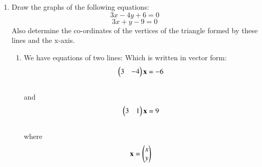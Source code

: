 \documentclass[journal,12pt,twocolumn]{IEEEtran}
\renewcommand\thesection{\arabic{section}}
\begin{document}
\begin{enumerate}[label=\thesection.\arabic*.,ref=\thesection.\theenumi]
\item Draw the graphs of the following equations: 
\[ 3x-4y+6=0 \]
\[ 3x+y-9=0 \]
Also determine the co-ordinates of the vertices of the triangle formed by these lines and the x-axis.\\
\solution\begin{enumerate}
    \item We have equations of two lines:
    Which is written in vector form:
    \begin{align}\label{eq:1}
        \begin{pmatrix}3&-4\end{pmatrix}\mathbf{x}=-6
    \end{align}\\
    and 
    \begin{align}\label{eq:2}
        \begin{pmatrix}3&1\end{pmatrix}\mathbf{x}=9
    \end{align}
\\where \begin{align}
        \mathbf{x}=\begin{pmatrix}x\\y\end{pmatrix}
    \end{align}


\end{enumerate}
\end{enumerate}
\end{document}
